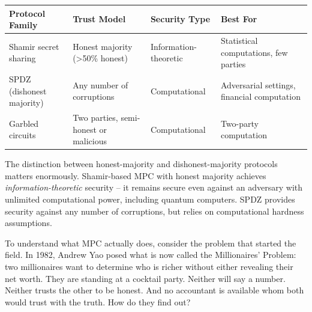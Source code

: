 \documentclass[
  11pt,
  openany]{report}
\begin{document}
\begin{longtable}[]{@{}
  >{\raggedright\arraybackslash}p{}
  >{\raggedright\arraybackslash}p{}
  >{\raggedright\arraybackslash}p{}
  >{\raggedright\arraybackslash}p{}@{}}
\toprule\noalign{}
\begin{minipage}[b]{\linewidth}\raggedright
Protocol Family
\end{minipage} & \begin{minipage}[b]{\linewidth}\raggedright
Trust Model
\end{minipage} & \begin{minipage}[b]{\linewidth}\raggedright
Security Type
\end{minipage} & \begin{minipage}[b]{\linewidth}\raggedright
Best For
\end{minipage} \\
\midrule\noalign{}
\arrayrulecolor{MidnightBlue}\midrule\arrayrulecolor{MidnightBorder}
\endhead
\bottomrule\noalign{}
\endlastfoot
Shamir secret sharing & Honest majority (\textgreater50\% honest) &
Information-theoretic & Statistical computations, few parties \\
SPDZ (dishonest majority) & Any number of corruptions & Computational &
Adversarial settings, financial computation \\
Garbled circuits & Two parties, semi-honest or malicious & Computational &
Two-party computation \\
\end{longtable}

The distinction between honest-majority and dishonest-majority protocols matters
enormously. Shamir-based MPC with honest majority achieves
\emph{information-theoretic} security -- it remains secure even against an
adversary with unlimited computational power, including quantum computers. SPDZ
provides security against any number of corruptions, but relies on computational
hardness assumptions.

To understand what MPC actually does, consider the problem that started the
field. In 1982, Andrew Yao posed what is now called the Millionaires' Problem:
two millionaires want to determine who is richer without either revealing their
net worth. They are standing at a cocktail party. Neither will say a number.
Neither trusts the other to be honest. And no accountant is available whom both
would trust with the truth. How do they find out?
\end{document}
